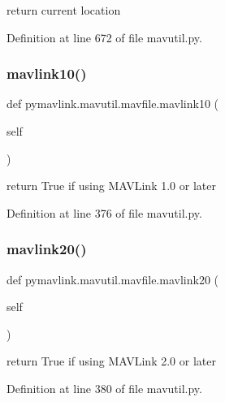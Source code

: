 \begin{DoxyVerb}return current location\end{DoxyVerb}
 

Definition at line 672 of file mavutil.\+py.

\mbox{\label{classpymavlink_1_1mavutil_1_1mavfile_a2539d7b34226d566b9167f4c0bc5d7a4}} 
\subsubsection{\texorpdfstring{mavlink10()}{mavlink10()}}
{\footnotesize\ttfamily def pymavlink.\+mavutil.\+mavfile.\+mavlink10 (\begin{DoxyParamCaption}\item[{}]{self }\end{DoxyParamCaption})}

\begin{DoxyVerb}return True if using MAVLink 1.0 or later\end{DoxyVerb}
 

Definition at line 376 of file mavutil.\+py.

\mbox{\label{classpymavlink_1_1mavutil_1_1mavfile_a84eb9bd740dd761537c4fc16d0c436b7}} 
\subsubsection{\texorpdfstring{mavlink20()}{mavlink20()}}
{\footnotesize\ttfamily def pymavlink.\+mavutil.\+mavfile.\+mavlink20 (\begin{DoxyParamCaption}\item[{}]{self }\end{DoxyParamCaption})}

\begin{DoxyVerb}return True if using MAVLink 2.0 or later\end{DoxyVerb}
 

Definition at line 380 of file mavutil.\+py.

\mbox{\label{classpymavlink_1_1mavutil_1_1mavfile_a243064da4dc092d07af642404240613b}} 
